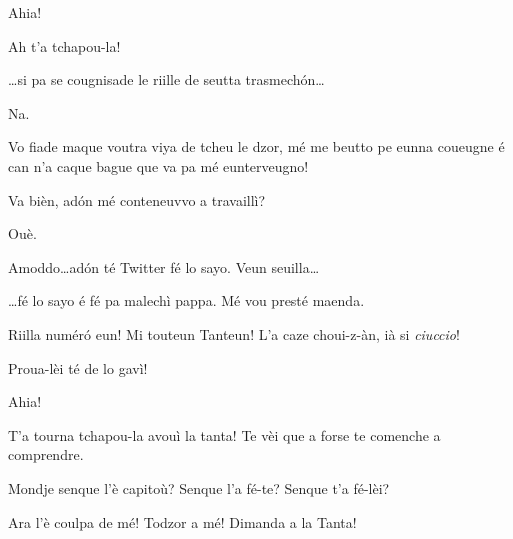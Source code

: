 \begin{drama}
\Twitterspeaks{} Ahia!

\Tanteunspeaks{} Ah t'a tchapou-la!

\Tantaspeaks \ldots si pa se cougnisade le riille de seutta trasmech\'on\ldots

\Alicespeaks Na.

\Tantaspeaks Vo fiade maque voutra viya de tcheu le dzor, mé me beutto pe eunna coueugne é can n'a caque bague que va pa  mé eunterveugno!

\Tanteunspeaks{} Va bièn, ad\'on mé conteneuvvo a travaillì?

\Tantaspeaks Ouè.



\Alicespeaks Amoddo\ldots ad\'on té Twitter fé lo sayo. Veun seuilla\ldots


\Alicespeaks\ldots fé lo sayo é fé pa malechì pappa. Mé vou presté maenda.


\Tantaspeaks Riilla numér\'o eun! Mi touteun Tanteun! L'a caze choui-z-àn, ià si \textit{ciuccio}!

\Tanteunspeaks Proua-lèi té de lo gavì!


\Twitterspeaks Ahia!


\Tanteunspeaks{} T'a tourna tchapou-la avouì la tanta! Te vèi que a forse te comenche a comprendre.


\Alicespeaks Mondje senque l'è capitoù?  Senque l'a fé-te? Senque t'a fé-lèi?

\Tanteunspeaks Ara l'è coulpa de mé! Todzor a mé! Dimanda a la Tanta!


\end{drama}
